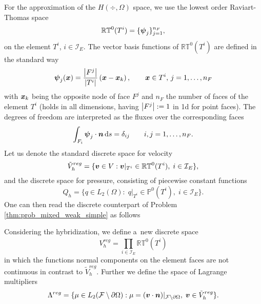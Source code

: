 For the approximation of the $H(\div,\Omega)$ space, we use the lowest order Raviart-Thomas space
\begin{equation}
    \mathbb{RT}^0(T^i) = \{\mathbf{\boldsymbol{\psi}}_j\}_{j=1}^{n_F}, 
\end{equation}
on the element $T^i$, $i\in\mathcal{I}_E$. The vector basis functions of $\mathbb{RT}^0(T^i)$
are defined in the standard way
\begin{equation}
    \mathbf{\boldsymbol{\psi}}_j(\mathbf{\boldsymbol{x}}) = \frac{\left|F^j\right|}{\left|T^i\right|} \left( \mathbf{\boldsymbol{x}} - \mathbf{\boldsymbol{x}}_k \right), \qquad \mathbf{\boldsymbol{x}}\in T^i,\, j=1,\ldots,n_F
\end{equation}
with $\mathbf{\boldsymbol{x}}_k$ being the opposite node of face $F^j$ and $n_F$ the number of faces of the element $T^i$
(holds in all dimensions, having $\left|F^j\right|:=1$ in 1d for point faces).
The degrees of freedom are interpreted as the fluxes over the corresponding faces
\begin{equation}
    \int_{F_i} \mathbf{\boldsymbol{\psi}}_j \cdot \mathbf{\boldsymbol{n}} \,{\rm d} s = \delta_{ij} \qquad i,j=1,\ldots,n_F.
\end{equation}
Let us denote the standard discrete space for velocity
\begin{equation}
    \tilde V_h^{reg} = \{\mathbf{\boldsymbol{v}}\in V: \mathbf{\boldsymbol{v}}|_{T^i} \in \mathbb{RT}^0(T^i),\; i\in\mathcal{I}_E \},
\end{equation}
and the discrete space for pressure, consisting of piecewise constant functions
\begin{equation}
    Q_h=\{q\in L_2(\Omega):\; q|_{T^i}\in \mathbb{P}^0(T^i),\; i\in\mathcal{I}_E\}.
\end{equation}
One can then read the discrete counterpart of Problem \ref{thm:prob_mixed_weak_simple} as follows


Considering the hybridization, we define a~new discrete space
\begin{equation}
    V_h^{reg} = \prod\limits_{i\in\mathcal{I}_E} \mathbb{RT}^0(T^i)
\end{equation}
in which the functions normal components on the element faces are not continuous
in contrast to $\tilde V_h^{reg}$.
Further we define the space of Lagrange multipliers
\begin{equation}
    \Lambda^{reg} = \{\mu\in L_2(\mathcal{F}\setminus\partial\Omega): \mu=(\mathbf{\boldsymbol{v}}\cdot\mathbf{\boldsymbol{n}})|_{\mathcal{F}\setminus\partial\Omega},\; \mathbf{\boldsymbol{v}}\in \tilde V_h^{reg}\}.
\end{equation}

